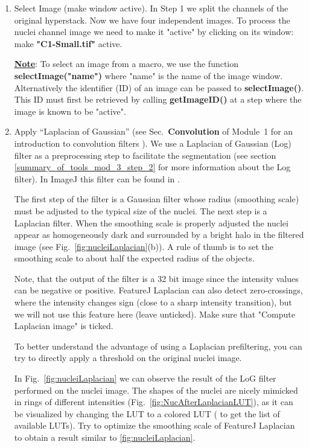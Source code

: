 \begin{enumerate}
    \item Select Image (make window active). 
    In Step 1 we split the channels of the original hyperstack. Now we have four independent images. To process the nuclei channel image we need to make it "active" by clicking on its window: make \textbf{"C1-Small.tif"} active.
    
    \underline{\textbf{Note}}: To select an image from a macro, we use the function \textbf{selectImage("name")} where "name" is the name of the image window. 
    Alternatively the identifier (ID) of an image can be passed to \textbf{selectImage()}. 
    This ID must first be retrieved by calling \textbf{getImageID()} at a step where the image is known to be "active".
    
    
    
    \item Apply ``Laplacian of Gaussian'' (see Sec.~\textbf{Convolution} of Module~1 for an introduction to convolution filters ). We use a Laplacian of Gaussian (Log) filter as a preprocessing step to facilitate the segmentation (see section \ref{summary_of_tools_mod_3_step_2} for more information about the Log filter). In ImageJ this filter can be found in .%
    
    The first step of the filter is a Gaussian filter whose radius (smoothing scale) must be adjusted to the typical size of the nuclei. The next step is a Laplacian filter. When the smoothing scale is properly adjusted the nuclei appear as homogeneously dark and surrounded by a bright halo in the filtered image (see Fig.~\ref{fig:nucleiLaplacian}(b)). A rule of thumb is to set the smoothing scale to about half the expected radius of the objects. 
    
    Note, that the output of the filter is a 32 bit image since the intensity values can be negative or positive. FeatureJ Laplacian can also detect zero-crossings, where the intensity changes sign (close to a sharp intensity transition), but we will not use this feature here (leave unticked). Make sure that "Compute Laplacian image" is ticked.
    
    To better understand the advantage of using a Laplacian prefiltering, you can try to directly apply a threshold on the original nuclei image.

    

In Fig.~\ref{fig:nucleiLaplacian} we can observe the result of the LoG filter performed on the nuclei image. The shapes of the nuclei are nicely mimicked in rings of different intensities (Fig.~\ref{fig:NucAfterLaplacianLUT}), as it can be visualized by changing the LUT to a colored LUT ( to get the list of available LUTs). Try to optimize the smoothing scale of FeatureJ Laplacian to obtain a result similar to \ref{fig:nucleiLaplacian}.


\end{enumerate}
